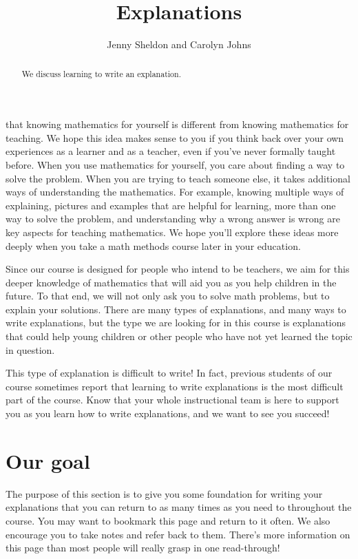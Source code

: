 \documentclass[noauthor,nooutcomes]{ximera}
\title{Explanations}
\author{Jenny Sheldon and Carolyn Johns}
\begin{document}
\begin{abstract}
We discuss learning to write an explanation.
\end{abstract}
\maketitle



  that knowing mathematics for yourself is different from knowing mathematics for teaching. We hope this idea makes sense to you if you think back over your own experiences as a learner and as a teacher, even if you've never formally taught before. When you use mathematics for yourself, you care about finding a way to solve the problem. When you are trying to teach someone else, it takes additional ways of understanding the mathematics. For example, knowing multiple ways of explaining, pictures and examples that are helpful for learning, more than one way to solve the problem, and understanding why a wrong answer is wrong are key aspects for teaching mathematics. We hope you'll explore these ideas more deeply when you take a math methods course later in your education.

Since our course is designed for people who intend to be teachers, we aim for this deeper knowledge of mathematics that will aid you as you help children in the future. To that end, we will not only ask you to solve math problems, but to explain your solutions. There are many types of explanations, and many ways to write explanations, but the type we are looking for in this course is explanations that could help young children or other people who have not yet learned the topic in question.

This type of explanation is difficult to write! In fact, previous students of our course sometimes report that learning to write explanations is the most difficult part of the course. Know that your whole instructional team is here to support you as you learn how to write explanations, and we want to see you succeed!

\section{Our goal}
The purpose of this section is to give you some foundation for writing your explanations that you can return to as many times as you need to throughout the course. You may want to bookmark this page and return to it often. We also encourage you to take notes and refer back to them. There's more information on this page than most people will really grasp in one read-through!
\end{document}
